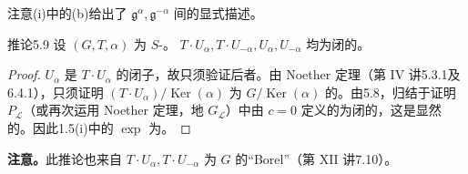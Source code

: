 注意(i)中的(b)给出了 $\mathfrak g^\alpha,\mathfrak g^{-\alpha}$ 间的显式描述。
\begin{SGAresult}{推论}{5.9}
设 $(G,T,\alpha)$ 为 $S$-。 $T\cdot U_\alpha,T\cdot U_{-\alpha},U_\alpha,U_{-\alpha}$ 均为闭的。
\end{SGAresult}
\begin{proof}
$U_\alpha$ 是 $T\cdot U_\alpha$ 的闭子，故只须验证后者。由 Noether 定理（第 IV 讲5.3.1及6.4.1），只须证明 $(T\cdot U_\alpha)/\operatorname{Ker}(\alpha)$ 为 $G/\operatorname{Ker}(\alpha)$ 的。由5.8，归结于证明 $P_{\mathscr L}$（或再次运用 Noether 定理，地 $G_{\mathscr L}$）中由 $c=0$ 定义的为闭的，这是显然的。因此1.5(i)中的 $\exp$ 为。
\end{proof}
\textbf{注意。}此推论也来自 $T\cdot U_\alpha,T\cdot U_{-\alpha}$ 为 $G$ 的“Borel”（第 XII 讲7.10）。

